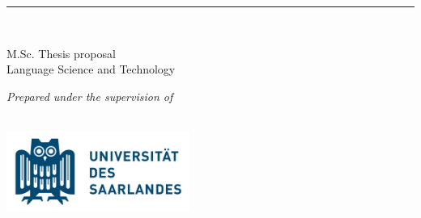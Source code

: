 %
\begin{titlepage}
	\tgherosfont
	\flushright
	\hfill
	\vfill
	
	{\color{ctcolormain}
	{\LARGE\textbf{\thesisTitle}} \par
	{\Large \thesisSubtitle} \par
	} %
	
	\rule[5pt]{\textwidth}{.4pt} \par
	
	{\LARGE \authorName} \\[2mm]

	\vfill
	
	{\large
	M.Sc. Thesis proposal \\[1mm]
	Language Science and Technology \\
	}	
	
%	
	\vfill	
	
	\textit{Prepared under the supervision of} \\
	\thesisFirstSupervisor \\
	\thesisSecondSupervisor 
	
	\vfill
	
	
	\includegraphics[width=6cm]{../img/uni_des_saarlandes} \\[2mm]
	{\Large \thesisUniversity} \\[2mm]
	{\large \thesisUniversityDepartment} \\
	
	\vfill
	
	\thesisDate \\
	
\end{titlepage}

\tableofcontents